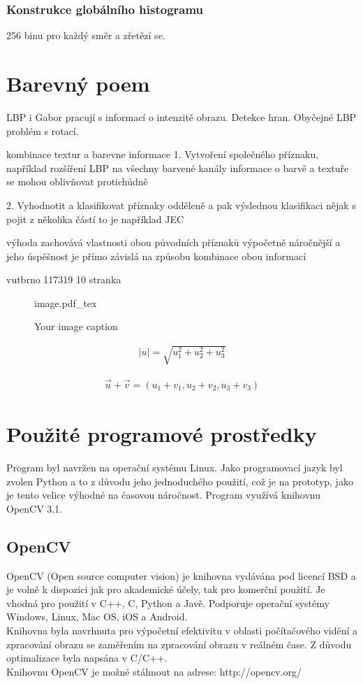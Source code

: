 \documentclass{report}
\begin{document}
\subsection{Konstrukce globálního histogramu}
256 binu pro každý směr a zřetězí se.

\chapter{Barevný poem}
LBP i Gabor pracují s informací o intenzitě obrazu. Detekce hran. Obyčejné LBP problém s rotací.

kombinace textur a barevne informace
1. Vytvoření společného příznaku, 
například rozšíření LBP na všechny barvené kanály
informace o barvě a textuře se mohou oblivňovat protichůdně

2. Vyhodnotit a klasifikovat příznaky odděleně a pak výslednou klasifikaci nějak s pojit z několika částí 
	to je například JEC
	
	výhoda zachovává vlastnosti obou původních příznaků 
	výpočetně náročnější a jeho úspěšnost je přímo závislá na způsobu kombinace obou informací	
	
vutbrno 117319 10 stranka
\begin{figure}[h!]
    \centering    
    \def\svgwidth{\columnwidth}
	{image.pdf_tex}    
    \caption{Your image caption}
    \label{fig:your image label}
\end{figure}


\begin{align}
   \label{velikost_vektoru_v_prostoru} |u| = \sqrt{u_1^2 + u_2^2 + u_3^2}
\end{align} 

\begin{align}
   \label{soucet_vektrou} \vec{u} + \vec{v} = (u_1 + v_1, u_2 + v_2, u_3 + v_3 )
\end{align} 
 

\chapter{Použité programové prostředky}
Program byl navržen na operační systému Linux. Jako programovací jazyk byl zvolen Python a to z důvodu jeho jednoduchého použití, což je na prototyp, jako je tento velice výhodné na časovou náročnost. Program využívá knihovnu OpenCV 3.1. 
  
\section{OpenCV}
OpenCV (Open source computer vision) je knihovna vydávána pod licencí BSD a je volně k dispozici jak pro akademické účely, tak pro komerční použití. Je vhodná pro použití v C++, C, Python a Javě. Podporuje operační systémy Windows, Linux, Mac OS, iOS a Android.
\\
Knihovna byla navrhnuta pro výpočetní efektivitu v oblasti počítačového vidění a zpracování obrazu se zaměřením na zpracování obrazu v reálném čase. Z důvodu optimalizace byla napsána v C/C++. 
\\
Knihovnu OpenCV je možné stáhnout na adrese: http://opencv.org/
\end{document}
